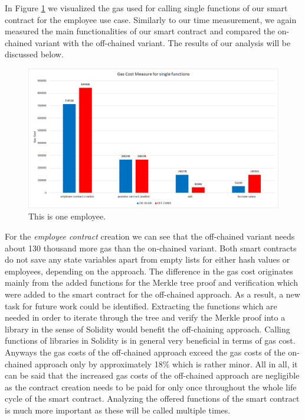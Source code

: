 In Figure \ref{fig:05_gas_cost_single} we visualized the gas used for calling single functions of our smart contract for the employee use case.
Similarly to our time measurement, we again measured the main functionalities of our smart contract and compared the on-chained variant with the off-chained variant.
The results of our analysis will be discussed below.

\begin{figure}[t]
	\centering
	\includegraphics[width=1.0\textwidth]{images/05_evaluation/05_gas_cost_single.png}
	\caption{\label{fig:05_gas_cost_single}This is one employee.}
\end{figure}

For the \textit{employee contract} creation we can see that the off-chained variant needs about 130 thousand more gas than the on-chained variant.
Both smart contracts do not save any state variables apart from empty lists for either hash values or employees, depending on the approach.
The difference in the gas cost originates mainly from the added functions for the Merkle tree proof and verification which were added to the smart contract for the off-chained approach.
As a result, a new task for future work could be identified.
Extracting the functions which are needed in order to iterate through the tree and verify the Merkle proof into a library in the sense of Solidity would benefit the off-chaining approach.
Calling functions of libraries in Solidity is in general very beneficial in terms of gas cost.
Anyways the gas costs of the off-chained approach exceed the gas costs of the on-chained approach only by approximately 18\% which is rather minor.
All in all, it can be said that the increased gas costs of the off-chained approach are negligible as the contract creation needs to be paid for only once throughout the whole life cycle of the smart contract.
Analyzing the offered functions of the smart contract is much more important as these will be called multiple times.

